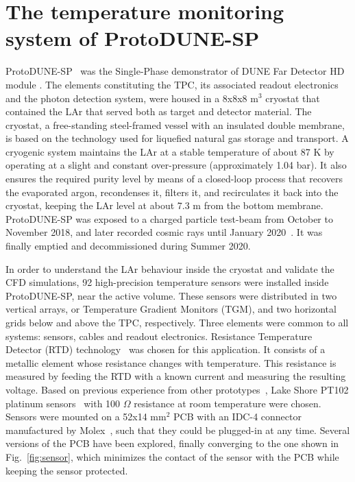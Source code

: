 \section{The temperature monitoring system of ProtoDUNE-SP}
\label{sec:protoDUNE}

\noindent ProtoDUNE-SP~\cite{pdsp_tdr} was the Single-Phase demonstrator of DUNE Far Detector HD module \cite{dune_tdr4}. %
The elements constituting the TPC, its associated readout electronics and the photon detection system, were housed in a 8x8x8 m$^3$ cryostat that contained the LAr that served both as target and detector material. The cryostat, a free-standing steel-framed vessel with an insulated double membrane, is based on the technology used for liquefied natural gas storage and transport. A cryogenic system maintains the LAr at a stable temperature of about 87 K by operating at a slight and constant over-pressure (approximately 1.04 bar). It also ensures the required purity level by means of a closed-loop process that recovers the evaporated argon, recondenses it, filters it, and recirculates it back into the cryostat, keeping the LAr level at about 7.3 m from the bottom membrane. ProtoDUNE-SP was exposed to a charged particle test-beam from October to November 2018, and later recorded cosmic rays until January 2020~\cite{pdsp_1,pdsp_2}. It was finally emptied and decommissioned during Summer 2020.

In order to understand the LAr behaviour inside the cryostat and validate the CFD simulations, 92 high-precision temperature sensors were installed inside ProtoDUNE-SP, near the active volume. These sensors were distributed in two vertical arrays, or Temperature Gradient Monitors (TGM), and two horizontal grids below and above the TPC, respectively. Three elements were common to all systems: sensors, cables and readout electronics. Resistance Temperature Detector (RTD) technology~\cite{minco} was chosen for this application. It consists of a metallic element whose resistance changes with temperature. This resistance is measured by feeding the RTD with a known current and measuring the resulting voltage. Based on previous experience from other prototypes~\cite{35t_1}, Lake Shore PT102 platinum sensors~\cite{pt102} with 100 $\Omega$ resistance at room temperature were chosen. Sensors were mounted on a 52x14 mm$^2$ PCB with an IDC-4 connector manufactured by Molex~\cite{bib:idc4male,bib:idc4female}, such that they could be plugged-in at any time. Several versions of the PCB have been explored, finally converging to the one shown in Fig.~\ref{fig:sensor}, which minimizes the contact of the sensor with the PCB while keeping the sensor protected.

